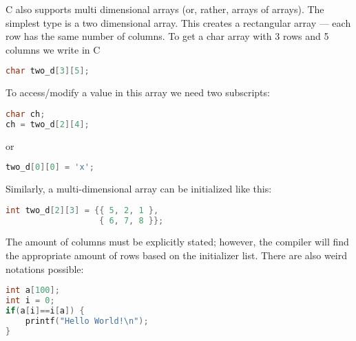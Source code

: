 C also supports multi dimensional arrays (or, rather, arrays of arrays). The
simplest type is a two dimensional array. This creates a rectangular array ---
each row has the same number of columns. To get a char array with 3 rows and 5
columns we write in C
\lstset{basicstyle=\scriptsize, numbers=left, captionpos=b, tabsize=4}
\begin{lstlisting}[caption=Section \thesection listing \arabic{arraycnt},language={C},
breaklines=true,xleftmargin=15pt,label=lst:section\thesection listing\arabic{arraycnt}]
char two_d[3][5];
\end{lstlisting}

To access/modify a value in this array we need two subscripts:
\lstset{basicstyle=\scriptsize, numbers=left, captionpos=b, tabsize=4}
\begin{lstlisting}[caption=Section \thesection listing \arabic{arraycnt},language={C},
breaklines=true,xleftmargin=15pt,label=lst:section\thesection listing\arabic{arraycnt}]
char ch;
ch = two_d[2][4];
\end{lstlisting}

or
\lstset{basicstyle=\scriptsize, numbers=left, captionpos=b, tabsize=4}
\begin{lstlisting}[caption=Section \thesection listing \arabic{arraycnt},language={C},
breaklines=true,xleftmargin=15pt,label=lst:section\thesection listing\arabic{arraycnt}]
two_d[0][0] = 'x';
\end{lstlisting}

Similarly, a multi-dimensional array can be initialized like this:
\lstset{basicstyle=\scriptsize, numbers=left, captionpos=b, tabsize=4}
\begin{lstlisting}[caption=Section \thesection listing \arabic{arraycnt},language={C},
breaklines=true,xleftmargin=15pt,label=lst:section\thesection listing\arabic{arraycnt}]
int two_d[2][3] = {{ 5, 2, 1 },
                   { 6, 7, 8 }};
\end{lstlisting}

The amount of columns must be explicitly stated; however, the compiler will
find the appropriate amount of rows based on the initializer list.  There are
also weird notations possible:
\lstset{basicstyle=\scriptsize, numbers=left, captionpos=b, tabsize=4}
\begin{lstlisting}[caption=Section \thesection listing \arabic{arraycnt},language={C},
breaklines=true,xleftmargin=15pt,label=lst:section\thesection listing\arabic{arraycnt}]
int a[100];
int i = 0;
if(a[i]==i[a]) {
	printf("Hello World!\n");
}
\end{lstlisting}

